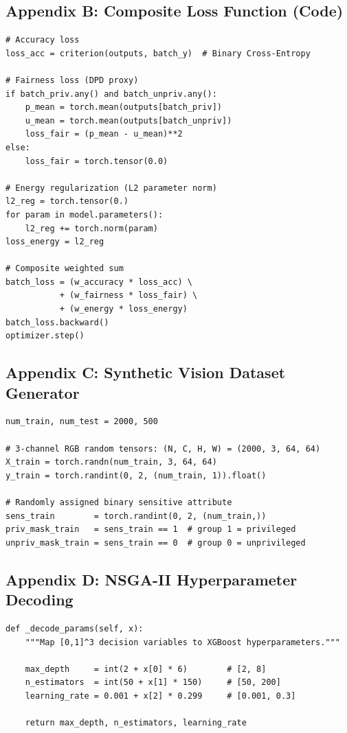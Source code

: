 \documentclass[12pt,a4paper]{article}
\begin{document}
\subsection{Appendix B: Composite Loss Function (Code)}
\begin{lstlisting}[style=pythonstyle, caption={Composite multi-objective loss calculation per mini-batch (trainer.py).}]
# Accuracy loss
loss_acc = criterion(outputs, batch_y)  # Binary Cross-Entropy

# Fairness loss (DPD proxy)
if batch_priv.any() and batch_unpriv.any():
    p_mean = torch.mean(outputs[batch_priv])
    u_mean = torch.mean(outputs[batch_unpriv])
    loss_fair = (p_mean - u_mean)**2
else:
    loss_fair = torch.tensor(0.0)

# Energy regularization (L2 parameter norm)
l2_reg = torch.tensor(0.)
for param in model.parameters():
    l2_reg += torch.norm(param)
loss_energy = l2_reg

# Composite weighted sum
batch_loss = (w_accuracy * loss_acc) \
           + (w_fairness * loss_fair) \
           + (w_energy * loss_energy)
batch_loss.backward()
optimizer.step()
\end{lstlisting}

\subsection{Appendix C: Synthetic Vision Dataset Generator}
\begin{lstlisting}[style=pythonstyle, caption={Synthetic vision data generation (data_loader.py).}]
num_train, num_test = 2000, 500

# 3-channel RGB random tensors: (N, C, H, W) = (2000, 3, 64, 64)
X_train = torch.randn(num_train, 3, 64, 64)
y_train = torch.randint(0, 2, (num_train, 1)).float()

# Randomly assigned binary sensitive attribute
sens_train        = torch.randint(0, 2, (num_train,))
priv_mask_train   = sens_train == 1  # group 1 = privileged
unpriv_mask_train = sens_train == 0  # group 0 = unprivileged
\end{lstlisting}

\subsection{Appendix D: NSGA-II Hyperparameter Decoding}
\begin{lstlisting}[style=pythonstyle, caption={Decision variable decoding in FairnessProblem (fairness_nsga2.py).}]
def _decode_params(self, x):
    """Map [0,1]^3 decision variables to XGBoost hyperparameters."""

    max_depth     = int(2 + x[0] * 6)        # [2, 8]
    n_estimators  = int(50 + x[1] * 150)     # [50, 200]
    learning_rate = 0.001 + x[2] * 0.299     # [0.001, 0.3]

    return max_depth, n_estimators, learning_rate
\end{lstlisting}
\end{document}
